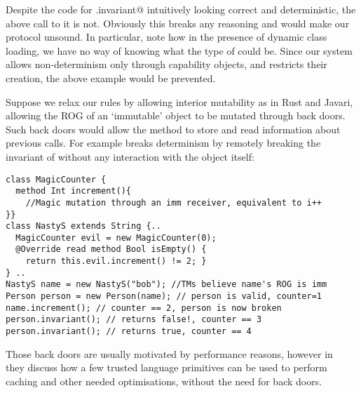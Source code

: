 Despite the code for \Q@Person.invariant@ intuitively looking correct and deterministic, the above call to it is not. Obviously this breaks any reasoning and would make our protocol unsound. 
In particular, note how in the presence of dynamic class loading, we have no way of knowing what the type of \Q@name@ could be. Since our system allows non-determinism only through capability objects, and 
restricts their creation, the above example would be prevented.

Suppose we relax our rules by allowing interior mutability
as in Rust and Javari, allowing the ROG of an `immutable' object to be mutated through back doors.
Such back doors would allow the \Q@invariant@ method to store and read information about previous calls.
For example \Q@MagicCounter@ breaks determinism by
remotely breaking the invariant of \Q@person@ without any interaction with the \Q@person@ object itself:
\begin{lstlisting}
class MagicCounter {
  method Int increment(){
    //Magic mutation through an imm receiver, equivalent to i++
}}
class NastyS extends String {..
  MagicCounter evil = new MagicCounter(0);
  @Override read method Bool isEmpty() {
    return this.evil.increment() != 2; }
} ..
NastyS name = new NastyS("bob"); //TMs believe name's ROG is imm
Person person = new Person(name); // person is valid, counter=1
name.increment(); // counter == 2, person is now broken
person.invariant(); // returns false!, counter == 3
person.invariant(); // returns true, counter == 4
\end{lstlisting}
Those back doors are usually motivated by performance reasons, however in~\cite{GordonEtAl12} they
discuss how a few trusted language primitives can be used to perform caching and other needed optimisations,
without the need for back doors.


